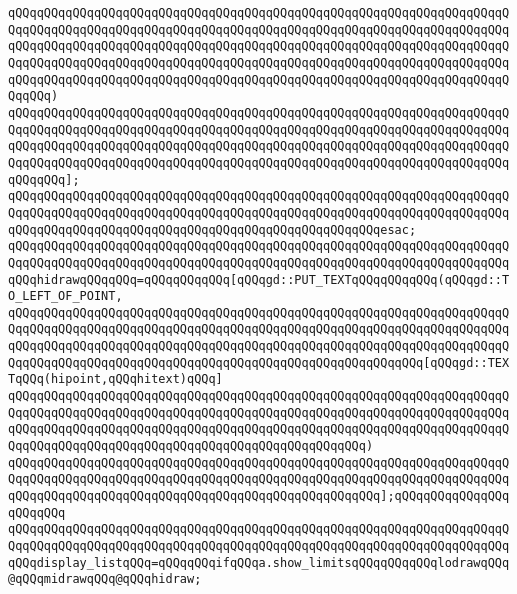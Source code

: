 \verb|qQQqqQQqqQQqqQQqqQQqqQQqqQQqqQQqqQQqqQQqqQQqqQQqqQQqqQQqqQQqqQQqqQQqqQQqqQQqqQQqqQQqqQQqqQQqqQQqqQQqqQQqqQQqqQQqqQQqqQQqqQQqqQQqqQQqqQQqqQQqqQQqqQQqqQQqqQQqqQQqqQQqqQQqqQQqqQQqqQQqqQQqqQQqqQQqqQQqqQQqqQQqqQQqqQQqqQQqqQQqqQQqqQQqqQQqqQQqqQQqqQQqqQQqqQQqqQQqqQQqqQQqqQQqqQQqqQQqqQQqqQQqqQQqqQQqqQQqqQQqqQQqqQQqqQQqqQQqqQQqqQQqqQQqqQQqqQQqqQQqqQQqqQQqqQQqqQQq)|\newline
\verb|qQQqqQQqqQQqqQQqqQQqqQQqqQQqqQQqqQQqqQQqqQQqqQQqqQQqqQQqqQQqqQQqqQQqqQQqqQQqqQQqqQQqqQQqqQQqqQQqqQQqqQQqqQQqqQQqqQQqqQQqqQQqqQQqqQQqqQQqqQQqqQQqqQQqqQQqqQQqqQQqqQQqqQQqqQQqqQQqqQQqqQQqqQQqqQQqqQQqqQQqqQQqqQQqqQQqqQQqqQQqqQQqqQQqqQQqqQQqqQQqqQQqqQQqqQQqqQQqqQQqqQQqqQQqqQQqqQQqqQQqqQQqqQQq];|\newline
\verb|qQQqqQQqqQQqqQQqqQQqqQQqqQQqqQQqqQQqqQQqqQQqqQQqqQQqqQQqqQQqqQQqqQQqqQQqqQQqqQQqqQQqqQQqqQQqqQQqqQQqqQQqqQQqqQQqqQQqqQQqqQQqqQQqqQQqqQQqqQQqqQQqqQQqqQQqqQQqqQQqqQQqqQQqqQQqqQQqqQQqqQQqqQQqqQQqesac;|\newline
\newline
\newline
\verb|qQQqqQQqqQQqqQQqqQQqqQQqqQQqqQQqqQQqqQQqqQQqqQQqqQQqqQQqqQQqqQQqqQQqqQQqqQQqqQQqqQQqqQQqqQQqqQQqqQQqqQQqqQQqqQQqqQQqqQQqqQQqqQQqqQQqqQQqqQQqqQQqhidrawqQQqqQQq=qQQqqQQqqQQq[qQQqgd::PUT_TEXTqQQqqQQqqQQq(qQQqgd::TO_LEFT_OF_POINT,|\newline
\verb|qQQqqQQqqQQqqQQqqQQqqQQqqQQqqQQqqQQqqQQqqQQqqQQqqQQqqQQqqQQqqQQqqQQqqQQqqQQqqQQqqQQqqQQqqQQqqQQqqQQqqQQqqQQqqQQqqQQqqQQqqQQqqQQqqQQqqQQqqQQqqQQqqQQqqQQqqQQqqQQqqQQqqQQqqQQqqQQqqQQqqQQqqQQqqQQqqQQqqQQqqQQqqQQqqQQqqQQqqQQqqQQqqQQqqQQqqQQqqQQqqQQqqQQqqQQqqQQqqQQqqQQqqQQq[qQQqgd::TEXTqQQq(hipoint,qQQqhitext)qQQq]|\newline
\verb|qQQqqQQqqQQqqQQqqQQqqQQqqQQqqQQqqQQqqQQqqQQqqQQqqQQqqQQqqQQqqQQqqQQqqQQqqQQqqQQqqQQqqQQqqQQqqQQqqQQqqQQqqQQqqQQqqQQqqQQqqQQqqQQqqQQqqQQqqQQqqQQqqQQqqQQqqQQqqQQqqQQqqQQqqQQqqQQqqQQqqQQqqQQqqQQqqQQqqQQqqQQqqQQqqQQqqQQqqQQqqQQqqQQqqQQqqQQqqQQqqQQqqQQqqQQqqQQqqQQq)|\newline
\verb|qQQqqQQqqQQqqQQqqQQqqQQqqQQqqQQqqQQqqQQqqQQqqQQqqQQqqQQqqQQqqQQqqQQqqQQqqQQqqQQqqQQqqQQqqQQqqQQqqQQqqQQqqQQqqQQqqQQqqQQqqQQqqQQqqQQqqQQqqQQqqQQqqQQqqQQqqQQqqQQqqQQqqQQqqQQqqQQqqQQqqQQqqQQqqQQq];qQQqqQQqqQQqqQQqqQQqqQQq|\newline
\newline
\newline
\verb|qQQqqQQqqQQqqQQqqQQqqQQqqQQqqQQqqQQqqQQqqQQqqQQqqQQqqQQqqQQqqQQqqQQqqQQqqQQqqQQqqQQqqQQqqQQqqQQqqQQqqQQqqQQqqQQqqQQqqQQqqQQqqQQqqQQqqQQqqQQqqQQqdisplay_listqQQq=qQQqqQQqifqQQqa.show_limitsqQQqqQQqqQQqlodrawqQQq@qQQqmidrawqQQq@qQQqhidraw;|\newline
